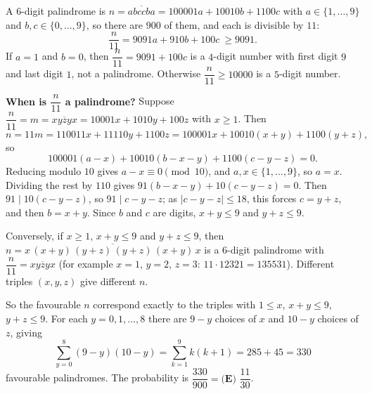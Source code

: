 A $6$-digit palindrome is $n=\overline{abccba}=100001a+10010b+1100c$ with $a\in\{1,\dots,9\}$ and $b,c\in\{0,\dots,9\}$, so there are $900$ of them, and each is divisible by $11$:
\[\dfrac{n}{11}=9091a+910b+100c\ \ge9091.\]
If $a=1$ and $b=0$, then $\dfrac{n}{11}=9091+100c$ is a $4$-digit number with first digit $9$ and last digit $1$, not a palindrome. Otherwise $\dfrac{n}{11}\ge10000$ is a $5$-digit number.

\textbf{When is $\dfrac{n}{11}$ a palindrome?} Suppose $\dfrac{n}{11}=m=\overline{xyzyx}=10001x+1010y+100z$ with $x\ge1$. Then
\[n=11m=110011x+11110y+1100z=100001x+10010(x+y)+1100(y+z),\]
so
\[100001(a-x)+10010(b-x-y)+1100(c-y-z)=0.\]
Reducing modulo $10$ gives $a-x\equiv0\pmod{10}$, and $a,x\in\{1,\dots,9\}$, so $a=x$. Dividing the rest by $110$ gives $91(b-x-y)+10(c-y-z)=0$. Then $91\mid10(c-y-z)$, so $91\mid c-y-z$; as $|c-y-z|\le18$, this forces $c=y+z$, and then $b=x+y$. Since $b$ and $c$ are digits, $x+y\le9$ and $y+z\le9$.

Conversely, if $x\ge1$, $x+y\le9$ and $y+z\le9$, then $n=\overline{x\,(x+y)\,(y+z)\,(y+z)\,(x+y)\,x}$ is a $6$-digit palindrome with $\dfrac{n}{11}=\overline{xyzyx}$ (for example $x=1$, $y=2$, $z=3$: $11\cdot12321=135531$). Different triples $(x,y,z)$ give different $n$.

So the favourable $n$ correspond exactly to the triples with $1\le x$, $x+y\le9$, $y+z\le9$. For each $y=0,1,\dots,8$ there are $9-y$ choices of $x$ and $10-y$ choices of $z$, giving
\[\sum_{y=0}^{8}(9-y)(10-y)=\sum_{k=1}^{9}k(k+1)=285+45=330\]
favourable palindromes. The probability is $\dfrac{330}{900}=\boxed{\textbf{(E) }\dfrac{11}{30}}$.
